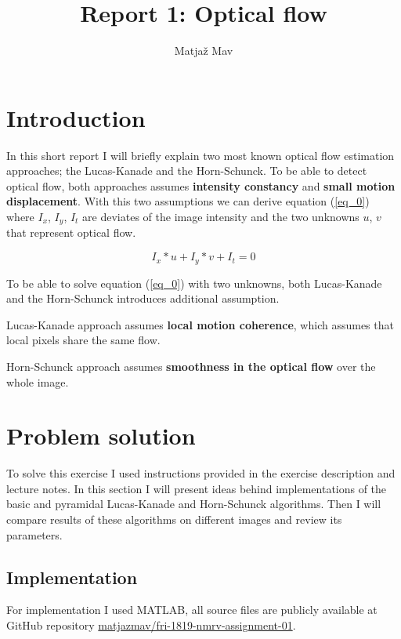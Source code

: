 \documentclass[runningheads]{llncs}
\begin{document}
%
\title{Report 1: Optical flow}
%
%
\author{Matjaž Mav}
%
\maketitle              %
%

\section{Introduction}
In this short report I will briefly explain two most known optical flow estimation approaches; the Lucas-Kanade and the Horn-Schunck. To be able to detect optical flow, both approaches assumes \textbf{intensity constancy} and \textbf{small motion displacement}. With this two assumptions we can derive equation (\ref{eq_0}) where $I_x$, $I_y$, $I_t$ are deviates of the image intensity and the two unknowns $u$, $v$ that represent optical flow.

\begin{equation}
\label{eq_0}
I_x*u+I_y*v+I_t = 0
\end{equation}

To be able to solve equation (\ref{eq_0}) with two unknowns, both Lucas-Kanade and the Horn-Schunck introduces additional assumption.

Lucas-Kanade approach assumes \textbf{local motion coherence}, which assumes that local pixels share the same flow.

Horn-Schunck approach assumes \textbf{smoothness in the optical flow} over the whole image.

\section{Problem solution}
To solve this exercise I used instructions provided in the exercise description and lecture notes. In this section I will present ideas behind implementations of the basic and pyramidal Lucas-Kanade and Horn-Schunck algorithms. Then I will compare results of these algorithms on different images and review its parameters.

\subsection{Implementation}
For implementation I used MATLAB, all source files are publicly available at GitHub repository \href{https://github.com/matjazmav/fri-1819-nmrv-assignment-01}{matjazmav/fri-1819-nmrv-assignment-01}.
\end{document}
